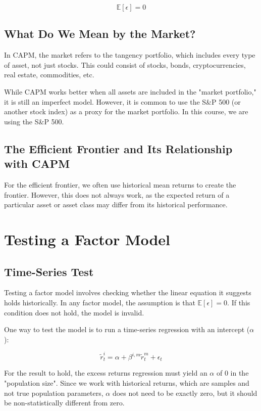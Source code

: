 \documentclass{article}
\begin{document}
$$
\mathbb{E}[\epsilon] = 0
$$

\subsection{What Do We Mean by the Market?}

In CAPM, the market refers to the tangency portfolio, which includes every type of asset, not just stocks. This could consist of stocks, bonds, cryptocurrencies, real estate, commodities, etc.

While CAPM works better when all assets are included in the "market portfolio," it is still an imperfect model. However, it is common to use the S\&P 500 (or another stock index) as a proxy for the market portfolio. In this course, we are using the S\&P 500.

\subsection{The Efficient Frontier and Its Relationship with CAPM}

For the efficient frontier, we often use historical mean returns to create the frontier. However, this does not always work, as the expected return of a particular asset or asset class may differ from its historical performance.

\section{Testing a Factor Model}

\subsection{Time-Series Test}

Testing a factor model involves checking whether the linear equation it suggests holds historically. In any factor model, the assumption is that $\mathbb{E}[\epsilon] = 0$. If this condition does not hold, the model is invalid.

One way to test the model is to run a time-series regression with an intercept ($\alpha$):

$$
\tilde{r}_t^i = \alpha + \beta^{i, m} \tilde{r}_t^m + \epsilon_t
$$

For the result to hold, the excess returns regression must yield an $\alpha$ of 0 in the "population size". Since we work with historical returns, which are samples and not true population parameters, $\alpha$ does not need to be exactly zero, but it should be non-statistically different from zero.
\end{document}
